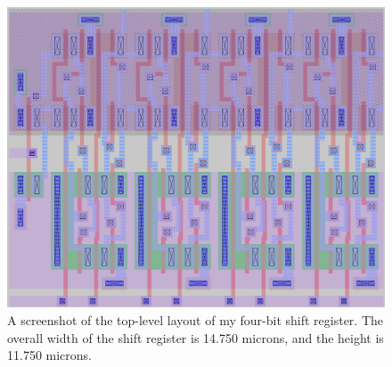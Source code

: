 \documentclass{article}
\begin{document}
\begin{figure}[!ht]
    \centering
    \includegraphics[width=\columnwidth]{../layout/shiftreg.png}
    \caption{A screenshot of the top-level layout of my four-bit shift register. The overall width of the shift register is 14.750 microns, and the height is 11.750 microns.}\label{fig:layout_top}
\end{figure}
\end{document}
